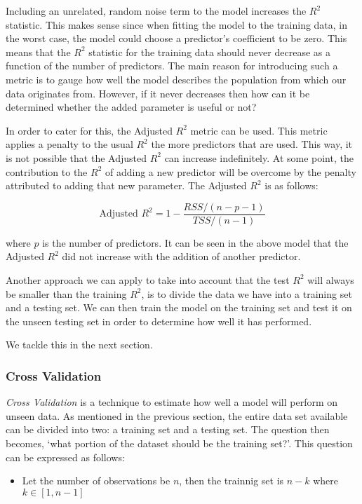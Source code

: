 \documentclass[11pt]{article}
\providecommand{\tightlist}{%
      \setlength{\itemsep}{0pt}\setlength{\parskip}{0pt}}
\begin{document}
    Including an unrelated, random noise term to the model increases the
\(R^2\) statistic. This makes sense since when fitting the model to the
training data, in the worst case, the model could choose a predictor's
coefficient to be zero. This means that the \(R^2\) statistic for the
training data should never decrease as a function of the number of
predictors. The main reason for introducing such a metric is to gauge
how well the model describes the population from which our data
originates from. However, if it never decreases then how can it be
determined whether the added parameter is useful or not?

In order to cater for this, the Adjusted \(R^2\) metric can be used.
This metric applies a penalty to the usual \(R^2\) the more predictors
that are used. This way, it is not possible that the Adjusted \(R^2\)
can increase indefinitely. At some point, the contribution to the
\(R^2\) of adding a new predictor will be overcome by the penalty
attributed to adding that new parameter. The Adjusted \(R^2\) is as
follows:

\[ \text{Adjusted }R^2 = 1 - \frac{ RSS/(n - p - 1) }{ TSS/(n - 1) } \]

where \(p\) is the number of predictors. It can be seen in the above
model that the Adjusted \(R^2\) did not increase with the addition of
another predictor.

Another approach we can apply to take into account that the test \(R^2\)
will always be smaller than the training \(R^2\), is to divide the data
we have into a training set and a testing set. We can then train the
model on the training set and test it on the unseen testing set in order
to determine how well it has performed.

We tackle this in the next section.

    \hypertarget{cross-validation}{%
\subsubsection{Cross Validation}\label{cross-validation}}

    \emph{Cross Validation} is a technique to estimate how well a model will
perform on unseen data. As mentioned in the previous section, the entire
data set available can be divided into two: a training set and a testing
set. The question then becomes, `what portion of the dataset should be
the training set?'. This question can be expressed as follows:

\begin{itemize}
\tightlist
\item
  Let the number of observations be \(n\), then the trainnig set is
  \(n-k\) where \(k \in [1,n-1]\)
\end{itemize}
\end{document}
